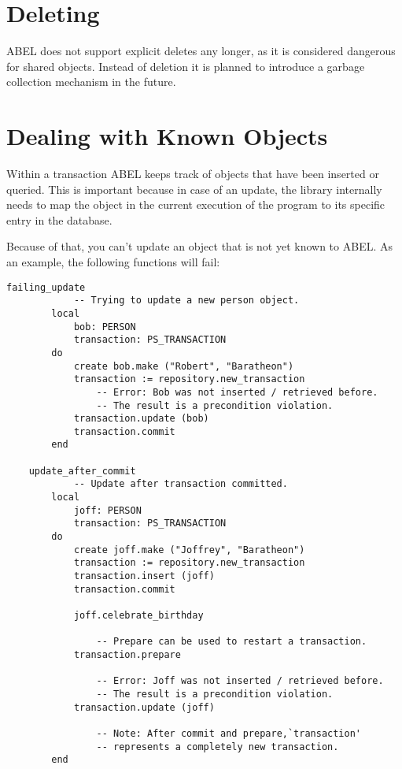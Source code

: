 \documentclass[a4paper,12pt]{report}
\begin{document}
\section{Deleting}
\label{section:simple_delete}

ABEL does not support explicit deletes any longer, as it is considered dangerous for shared objects.
Instead of deletion it is planned to introduce a garbage collection mechanism in the future.

\section{Dealing with Known Objects}
\label{section:dealing_with_known_objects}

Within a transaction ABEL keeps track of objects that have been inserted or queried.
This is important because in case of an update, the library internally needs to map the object in the current execution of the program to its specific entry in the database.

Because of that, you can't update an object that is not yet known to ABEL.
As an example, the following functions will fail:

\begin{lstlisting}[language=OOSC2Eiffel, captionpos=b, caption={Common pitfalls with update.}, label={lst:failing_update_delete}]
	failing_update
			-- Trying to update a new person object.
		local
			bob: PERSON
			transaction: PS_TRANSACTION
		do
			create bob.make ("Robert", "Baratheon")
			transaction := repository.new_transaction
				-- Error: Bob was not inserted / retrieved before.
				-- The result is a precondition violation.
			transaction.update (bob)
			transaction.commit
		end

	update_after_commit
			-- Update after transaction committed.
		local
			joff: PERSON
			transaction: PS_TRANSACTION
		do
			create joff.make ("Joffrey", "Baratheon")
			transaction := repository.new_transaction
			transaction.insert (joff)
			transaction.commit

			joff.celebrate_birthday

				-- Prepare can be used to restart a transaction.
			transaction.prepare

				-- Error: Joff was not inserted / retrieved before.
				-- The result is a precondition violation.
			transaction.update (joff)
			
				-- Note: After commit and prepare,`transaction'
				-- represents a completely new transaction.
		end
\end{lstlisting}
\end{document}
